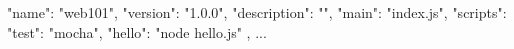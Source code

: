 {
  "name": "web101",
  "version": "1.0.0",
  "description": "",
  "main": "index.js",
  "scripts": {
    "test": "mocha",
    "hello": "node hello.js"
  },
  ...
}
